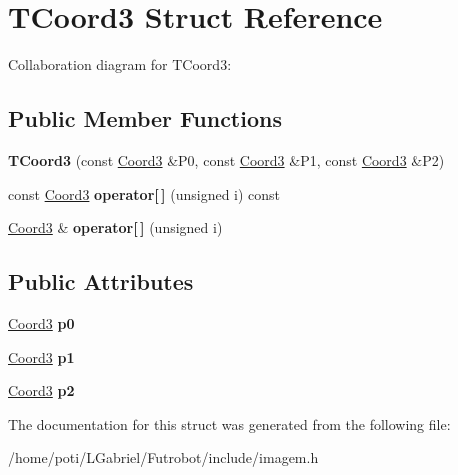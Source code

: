 \hypertarget{structTCoord3}{}\section{T\+Coord3 Struct Reference}
\label{structTCoord3}


Collaboration diagram for T\+Coord3\+:
\subsection*{Public Member Functions}
\begin{DoxyCompactItemize}
\item 
{\bfseries T\+Coord3} (const \hyperlink{structCoord3}{Coord3} \&P0, const \hyperlink{structCoord3}{Coord3} \&P1, const \hyperlink{structCoord3}{Coord3} \&P2)\hypertarget{structTCoord3_ae4e16df1446a5fd062452112de7c40d0}{}\label{structTCoord3_ae4e16df1446a5fd062452112de7c40d0}

\item 
const \hyperlink{structCoord3}{Coord3} {\bfseries operator\mbox{[}$\,$\mbox{]}} (unsigned i) const \hypertarget{structTCoord3_abb3b3263bfcfec445dfa381d54f2a593}{}\label{structTCoord3_abb3b3263bfcfec445dfa381d54f2a593}

\item 
\hyperlink{structCoord3}{Coord3} \& {\bfseries operator\mbox{[}$\,$\mbox{]}} (unsigned i)\hypertarget{structTCoord3_a423fef46c408731824de6a8fc6b17cf1}{}\label{structTCoord3_a423fef46c408731824de6a8fc6b17cf1}

\end{DoxyCompactItemize}
\subsection*{Public Attributes}
\begin{DoxyCompactItemize}
\item 
\hyperlink{structCoord3}{Coord3} {\bfseries p0}\hypertarget{structTCoord3_a506176fbbd7e108a4fcc6506b1df8695}{}\label{structTCoord3_a506176fbbd7e108a4fcc6506b1df8695}

\item 
\hyperlink{structCoord3}{Coord3} {\bfseries p1}\hypertarget{structTCoord3_acea3183e94563178c774489c45fdb3b4}{}\label{structTCoord3_acea3183e94563178c774489c45fdb3b4}

\item 
\hyperlink{structCoord3}{Coord3} {\bfseries p2}\hypertarget{structTCoord3_a52d2db7bfb7154684d52d6b587ddab17}{}\label{structTCoord3_a52d2db7bfb7154684d52d6b587ddab17}

\end{DoxyCompactItemize}


The documentation for this struct was generated from the following file\+:\begin{DoxyCompactItemize}
\item 
/home/poti/\+L\+Gabriel/\+Futrobot/include/imagem.\+h\end{DoxyCompactItemize}
